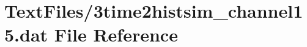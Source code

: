 \hypertarget{3time2histsim__channel15_8dat}{}\section{Text\+Files/3time2histsim\+\_\+channel15.dat File Reference}
\label{3time2histsim__channel15_8dat}
